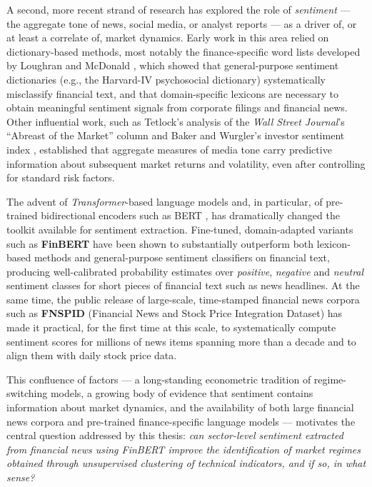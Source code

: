 A second, more recent strand of research has explored the role of
\emph{sentiment} --- the aggregate tone of news, social media, or analyst
reports --- as a driver of, or at least a correlate of, market dynamics.
Early work in this area relied on dictionary-based methods, most notably
the finance-specific word lists developed by Loughran and McDonald
\cite{loughranmcdonald2011}, which showed that general-purpose sentiment
dictionaries (e.g., the Harvard-IV psychosocial dictionary) systematically
misclassify financial text, and that domain-specific lexicons are
necessary to obtain meaningful sentiment signals from corporate filings
and financial news. Other influential work, such as Tetlock's analysis of
the \emph{Wall Street Journal}'s ``Abreast of the Market'' column
\cite{tetlock2007} and Baker and Wurgler's investor sentiment index
\cite{baker2006}, established that aggregate measures of media tone carry
predictive information about subsequent market returns and volatility,
even after controlling for standard risk factors.

The advent of \emph{Transformer}-based language models
\cite{vaswani2017attention} and, in particular, of pre-trained
bidirectional encoders such as BERT \cite{devlin2019bert}, has
dramatically changed the toolkit available for sentiment extraction.
Fine-tuned, domain-adapted variants such as \textbf{FinBERT}
\cite{finbert2019} have been shown to substantially outperform both
lexicon-based methods and general-purpose sentiment classifiers on
financial text, producing well-calibrated probability estimates over
\emph{positive}, \emph{negative} and \emph{neutral} sentiment classes for
short pieces of financial text such as news headlines. At the same time,
the public release of large-scale, time-stamped financial news corpora
such as \textbf{FNSPID} (Financial News and Stock Price Integration
Dataset) \cite{zhang2023fnspid} has made it practical, for the first time
at this scale, to systematically compute sentiment scores for millions of
news items spanning more than a decade and to align them with daily stock
price data.

This confluence of factors --- a long-standing econometric tradition of
regime-switching models, a growing body of evidence that sentiment
contains information about market dynamics, and the availability of
both large financial news corpora and pre-trained finance-specific
language models --- motivates the central question addressed by this
thesis: \emph{can sector-level sentiment extracted from financial news
using FinBERT improve the identification of market regimes obtained
through unsupervised clustering of technical indicators, and if so, in
what sense?}

